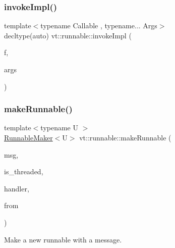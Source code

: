 \mbox{\label{namespacevt_1_1runnable_af14b1c72fc3bf8437c2b89021af7eecf}} 
\subsubsection{\texorpdfstring{invoke\+Impl()}{invokeImpl()}\hspace{0.1cm}{\footnotesize\ttfamily [2/2]}}
{\footnotesize\ttfamily template$<$typename Callable , typename... Args$>$ \\
decltype(auto) vt\+::runnable\+::invoke\+Impl (\begin{DoxyParamCaption}\item[{Callable \&\&}]{f,  }\item[{Args \&\&...}]{args }\end{DoxyParamCaption})}

\mbox{\label{namespacevt_1_1runnable_afb8d5dae85a94591271296e201b4f838}} 
\subsubsection{\texorpdfstring{make\+Runnable()}{makeRunnable()}}
{\footnotesize\ttfamily template$<$typename U $>$ \\
\hyperlink{structvt_1_1runnable_1_1_runnable_maker}{Runnable\+Maker}$<$U$>$ vt\+::runnable\+::make\+Runnable (\begin{DoxyParamCaption}\item[{\hyperlink{namespacevt_ab2b3d506ec8e8d1540aede826d84a239}{Msg\+Shared\+Ptr}$<$ U $>$ const \&}]{msg,  }\item[{bool}]{is\+\_\+threaded,  }\item[{\hyperlink{namespacevt_af64846b57dfcaf104da3ef6967917573}{Handler\+Type}}]{handler,  }\item[{\hyperlink{namespacevt_a866da9d0efc19c0a1ce79e9e492f47e2}{Node\+Type}}]{from }\end{DoxyParamCaption})}



Make a new runnable with a message. 


